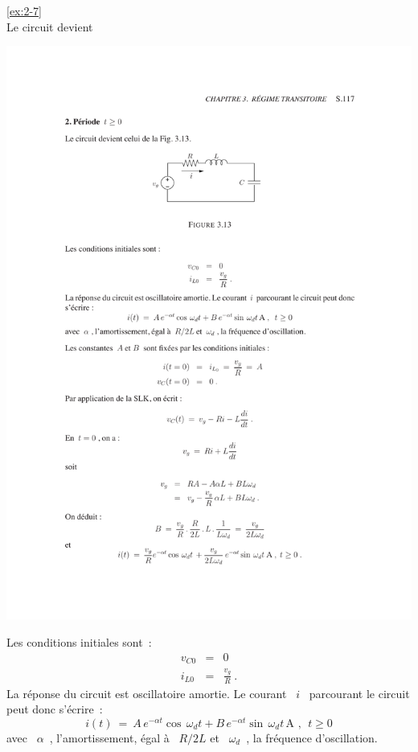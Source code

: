 \begin{solexercise}{\ref{ex:2-7}}
\\
Le circuit devient
\begin{center}
	\includegraphics[width=\linewidth]{sol_exercices/ex3-7-2}
\end{center}
Les conditions initiales sont~:
\begin{eqnarray*}
	v_{C0} &=& 0\\
	i_{L0} &=& \frac{v_g}{R}~.
\end{eqnarray*}
La r\'eponse du circuit est oscillatoire amortie. Le courant \ $i$ \
parcourant le circuit peut donc s'\'ecrire~:
\[ i(t) \: = \: A \, e^{-\alpha t} \cos\, \omega_d t + 
B\, e^{-\alpha t} \sin \, \omega_d t\, \text{A~}, ~~t\geq 0 \]
avec \ $\alpha$~, l'amortissement, \'egal \`a \ $R/2L$
et \ $\omega_d$~, la fr\'equence d'oscillation.


\end{solexercise}
